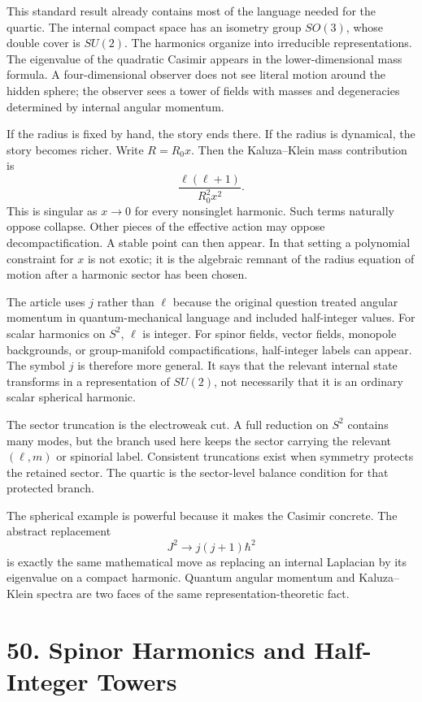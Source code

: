 \documentclass[11pt]{article}
\newcommand{\hb}{\hbar}
\begin{document}
This standard result already contains most of the language needed for the quartic. The internal compact space has an isometry group \(SO(3)\), whose double cover is \(SU(2)\). The harmonics organize into irreducible representations. The eigenvalue of the quadratic Casimir appears in the lower-dimensional mass formula. A four-dimensional observer does not see literal motion around the hidden sphere; the observer sees a tower of fields with masses and degeneracies determined by internal angular momentum.

If the radius is fixed by hand, the story ends there. If the radius is dynamical, the story becomes richer. Write \(R=R_0x\). Then the Kaluza--Klein mass contribution is
\[
        \frac{\ell(\ell+1)}{R_0^2x^2}.
\]
This is singular as \(x\to0\) for every nonsinglet harmonic. Such terms naturally oppose collapse. Other pieces of the effective action may oppose decompactification. A stable point can then appear. In that setting a polynomial constraint for \(x\) is not exotic; it is the algebraic remnant of the radius equation of motion after a harmonic sector has been chosen.

The article uses \(j\) rather than \(\ell\) because the original question treated angular momentum in quantum-mechanical language and included half-integer values. For scalar harmonics on \(S^2\), \(\ell\) is integer. For spinor fields, vector fields, monopole backgrounds, or group-manifold compactifications, half-integer labels can appear. The symbol \(j\) is therefore more general. It says that the relevant internal state transforms in a representation of \(SU(2)\), not necessarily that it is an ordinary scalar spherical harmonic.

The sector truncation is the electroweak cut. A full reduction on \(S^2\) contains many modes, but the branch used here keeps the sector carrying the relevant \((\ell,m)\) or spinorial label. Consistent truncations exist when symmetry protects the retained sector. The quartic is the sector-level balance condition for that protected branch.

The spherical example is powerful because it makes the Casimir concrete. The abstract replacement
\[
        J^2\to j(j+1)\hb^2
\]
is exactly the same mathematical move as replacing an internal Laplacian by its eigenvalue on a compact harmonic. Quantum angular momentum and Kaluza--Klein spectra are two faces of the same representation-theoretic fact.

\section*{50. Spinor Harmonics and Half-Integer Towers}
\end{document}

